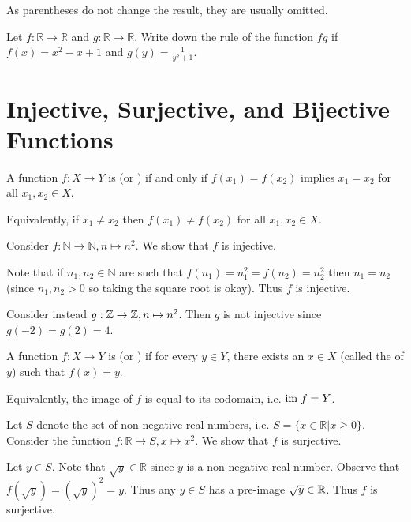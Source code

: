 As parentheses do not change the result, they are usually omitted.

\begin{exercise}
    Let $f: \mathbb{R} \to \mathbb{R}$ and $g: \mathbb{R} \to \mathbb{R}$. Write down the rule of the function $fg$ if $f(x) = x^2 - x + 1$ and $g(y) = \frac1{y^2+1}$.
\end{exercise}

\section{Injective, Surjective, and Bijective Functions}
\begin{definition}
    A function $f: X \to Y$ is  (or ) if and only if $f(x_1) = f(x_2)$ implies $x_1 = x_2$ for all $x_1, x_2 \in X$.
\end{definition}
\begin{remark}
    Equivalently, if $x_1 \neq x_2$ then $f(x_1) \neq f(x_2)$ for all $x_1, x_2 \in X$.
\end{remark}

\begin{example}
    Consider $f: \mathbb{N} \to \mathbb{N}, n \mapsto n^2$. We show that $f$ is injective.

    Note that if $n_1, n_2 \in \mathbb{N}$ are such that $f(n_1) = n_1^2 = f(n_2) = n_2^2$ then $n_1 = n_2$ (since $n_1, n_2 > 0$ so taking the square root is okay). Thus $f$ is injective.
\end{example}
\begin{example}
    Consider instead $g: \mathbb{Z} \to \mathbb{Z}, n \mapsto n^2$. Then $g$ is not injective since $g(-2) = g(2) = 4$.
\end{example}

\begin{definition}
    A function $f: X \to Y$ is  (or ) if for every $y \in Y$, there exists an $x \in X$ (called the  of $y$) such that $f(x) = y$.
\end{definition}
\begin{remark}
    Equivalently, the image of $f$ is equal to its codomain, i.e. $\mathrm{im}\; f = Y$.
\end{remark}

\begin{example}
    Let $S$ denote the set of non-negative real numbers, i.e. $S = \{x\in\mathbb{R} | x \geq 0\}$. Consider the function $f: \mathbb{R} \to S, x \mapsto x^2$. We show that $f$ is surjective.

    Let $y \in S$. Note that $\sqrt{y} \in \mathbb{R}$ since $y$ is a non-negative real number. Observe that $f(\sqrt{y}) = (\sqrt y)^2 = y$. Thus any $y \in S$ has a pre-image $\sqrt y \in \mathbb{R}$. Thus $f$ is surjective.
\end{example}

